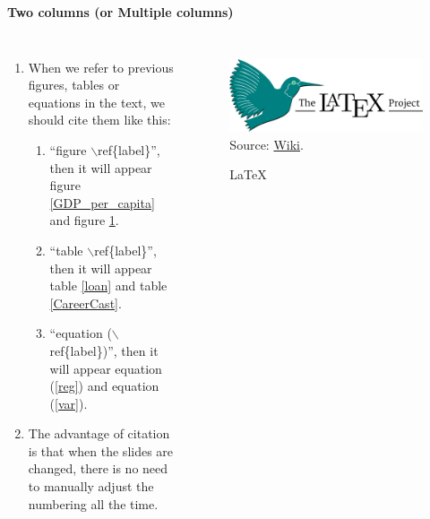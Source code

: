 \documentclass[12pt, aspectratio=169]{beamer}
\begin{document}

\linespread{1}
\begin{frame}{\textbf{Two columns (or Multiple columns)}}
\linespread{1.5}

	\begin{columns}[c] %
			\begin{enumerate}[]
				\item When we refer to previous figures, tables or equations in the text, we should cite them like this:
				\begin{enumerate}[]
					\item ``figure $\backslash$ref\{label\}'', 
						then it will appear figure \ref{GDP_per_capita} and figure \ref{LaTeX}.
					\item ``table $\backslash$ref\{label\}'',
						then it will appear table \ref{loan} and table \ref{CareerCast}.
					\item ``equation ($\backslash$ref\{label\})'',
						then it will appear equation (\ref{reg}) and equation (\ref{var}).
				\end{enumerate}
				\item The advantage of citation is that when the slides are changed, there is no need to manually adjust the numbering all the time.
			\end{enumerate}

			\begin{figure}
				\includegraphics[scale=0.03]{Fig/LaTeX.png}\\
				\scriptsize{Source:
				\href{https://en.wikipedia.org/wiki/LaTeX}{Wiki}.}\\
				\caption{\LaTeX}
				\label{LaTeX} 
			\end{figure}
	\end{columns}
\end{frame}
\end{document}
